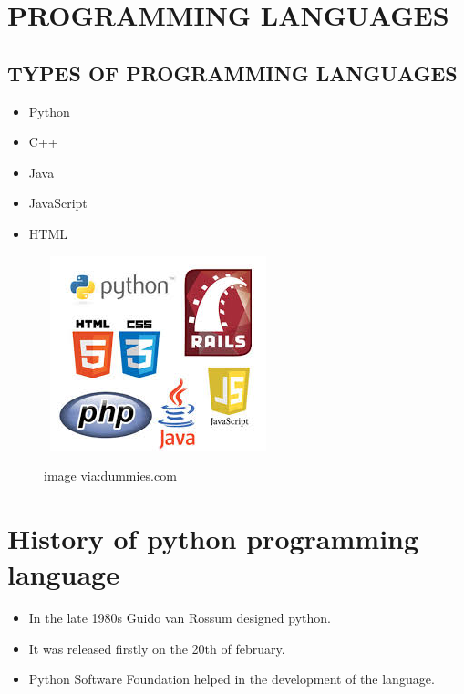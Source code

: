 \documentclass[12pt]{article}
\begin{document}
	
\section{PROGRAMMING LANGUAGES}
 
\subsection{TYPES OF PROGRAMMING LANGUAGES}

\begin{itemize}                                         
	\item Python                         
	\item C++                            
	\item Java
	\item JavaScript
	\item HTML
\end{itemize}

\begin{figure}[h]
		\
		\includegraphics[width=0.7\linewidth]{bababooey}
		\caption{image via:dummies.com}
		\label{fig:bababooey}
\end{figure}

\newpage

\section{History of python programming language}

\begin{itemize}
           \item In the late 1980s Guido van Rossum designed python.
           \item It was released firstly on the 20th of february.
           \item Python Software Foundation helped in the development of the language.

\end{itemize}
\end{document}
